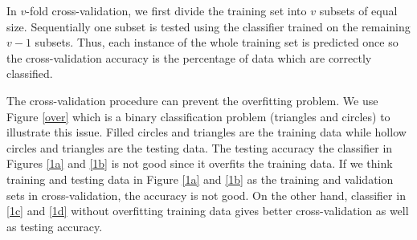 \documentclass[12pt]{article}
\begin{document}
In $v$-fold cross-validation,
we first divide the training set into $v$ subsets of equal
size. Sequentially one subset is tested using the
classifier trained on the remaining $v-1$ subsets.
Thus, each instance of the whole training set is 
predicted once so the cross-validation accuracy
is the percentage of data which are correctly classified.

The cross-validation procedure can prevent the overfitting
problem. We use Figure \ref{over} which is a binary 
classification problem (triangles and circles) to 
illustrate this issue. Filled circles and triangles 
are the training data while hollow circles
and triangles are the testing data. The testing
accuracy the classifier in Figures \ref{1a} and \ref{1b}
 is not good since it overfits 
the training data. If we think training and testing
data in Figure \ref{1a} and \ref{1b} as the training  and
validation sets in cross-validation, the accuracy is
not good. On the other hand, classifier in \ref{1c} and \ref{1d} without
overfitting training data gives better cross-validation 
as well as testing accuracy. 
\end{document}
